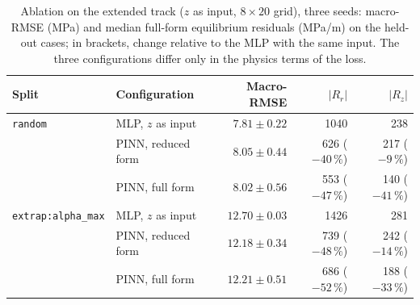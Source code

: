 \documentclass[subscriptcorrection,upint,varvw,barcolor=Goldenrod3,mathalfa=cal=euler,balance,hyphenate,french,pdf-a]{asmejour} %
\begin{document}
\begin{table}[t]
\caption{Ablation on the extended track ($z$ as input, $8\times20$ grid), three seeds: macro-RMSE (MPa) and median full-form equilibrium residuals (MPa/m) on the held-out cases; in brackets, change relative to the MLP with the same input. The three configurations differ only in the physics terms of the loss.} %
\label{tab:ablation2d}
\centering\small
\begin{tabular}{@{}llrrr@{}}
\toprule
Split & Configuration & Macro-RMSE & $|R_r|$ & $|R_z|$ \\
\midrule
\texttt{random} & MLP, $z$ as input      & $7.81\pm0.22$  & 1040 & 238 \\
                & PINN, reduced form     & $8.05\pm0.44$  & 626 ($-40\,\%$) & 217 ($-9\,\%$) \\
                & PINN, full form        & $8.02\pm0.56$  & 553 ($-47\,\%$) & 140 ($-41\,\%$) \\
\addlinespace
\texttt{extrap:alpha\_max} & MLP, $z$ as input  & $12.70\pm0.03$ & 1426 & 281 \\
                           & PINN, reduced form & $12.18\pm0.34$ & 739 ($-48\,\%$) & 242 ($-14\,\%$) \\
                           & PINN, full form    & $12.21\pm0.51$ & 686 ($-52\,\%$) & 188 ($-33\,\%$) \\
\bottomrule
\end{tabular}
\end{table}
\end{document}
